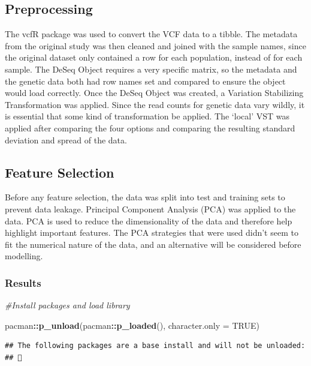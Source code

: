 \documentclass[
]{article}
\newenvironment{Shaded}{\begin{snugshade}}{\end{snugshade}}
\newcommand{\AttributeTok}[1]{\textcolor[rgb]{0.13,0.29,0.53}{#1}}
\newcommand{\CommentTok}[1]{\textcolor[rgb]{0.56,0.35,0.01}{\textit{#1}}}
\newcommand{\ConstantTok}[1]{\textcolor[rgb]{0.56,0.35,0.01}{#1}}
\newcommand{\FunctionTok}[1]{\textcolor[rgb]{0.13,0.29,0.53}{\textbf{#1}}}
\newcommand{\NormalTok}[1]{#1}
\newcommand{\SpecialCharTok}[1]{\textcolor[rgb]{0.81,0.36,0.00}{\textbf{#1}}}
\begin{document}
\subsection{Preprocessing}\label{preprocessing}

The vcfR package was used to convert the VCF data to a tibble. The
metadata from the original study was then cleaned and joined with the
sample names, since the original dataset only contained a row for each
population, instead of for each sample. The DeSeq Object requires a very
specific matrix, so the metadata and the genetic data both had row names
set and compared to ensure the object would load correctly. Once the
DeSeq Object was created, a Variation Stabilizing Transformation was
applied. Since the read counts for genetic data vary wildly, it is
essential that some kind of transformation be applied. The `local' VST
was applied after comparing the four options and comparing the resulting
standard deviation and spread of the data.

\subsection{Feature Selection}\label{feature-selection}

Before any feature selection, the data was split into test and training
sets to prevent data leakage. Principal Component Analysis (PCA) was
applied to the data. PCA is used to reduce the dimensionality of the
data and therefore help highlight important features. The PCA strategies
that were used didn't seem to fit the numerical nature of the data, and
an alternative will be considered before modelling.

\subsubsection{Results}\label{results}

\begin{Shaded}
\begin{Highlighting}[]
\CommentTok{\#Install packages and load library}

\NormalTok{pacman}\SpecialCharTok{::}\FunctionTok{p\_unload}\NormalTok{(pacman}\SpecialCharTok{::}\FunctionTok{p\_loaded}\NormalTok{(), }\AttributeTok{character.only =} \ConstantTok{TRUE}\NormalTok{)}
\end{Highlighting}
\end{Shaded}

\begin{verbatim}
## The following packages are a base install and will not be unloaded:
## 
\end{verbatim}
\end{document}

